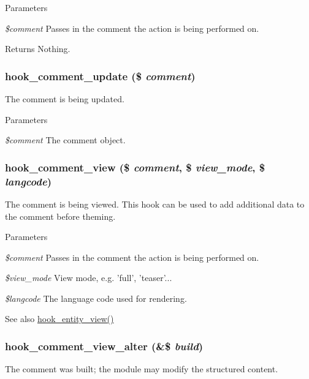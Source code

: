 \begin{DoxyParams}{Parameters}
\item[{\em \$comment}]Passes in the comment the action is being performed on. \end{DoxyParams}
\begin{DoxyReturn}{Returns}
Nothing. 
\end{DoxyReturn}
\hypertarget{group__hooks_ga63e0b41e7dbaadbf352b0a9c246d5ae5}{
\subsubsection[{hook\_\-comment\_\-update}]{\setlength{\rightskip}{0pt plus 5cm}hook\_\-comment\_\-update (\$ {\em comment})}}
\label{group__hooks_ga63e0b41e7dbaadbf352b0a9c246d5ae5}
The comment is being updated.


\begin{DoxyParams}{Parameters}
\item[{\em \$comment}]The comment object. \end{DoxyParams}
\hypertarget{group__hooks_gab162cbd3dc1b0395011df47ca3f98aa3}{
\subsubsection[{hook\_\-comment\_\-view}]{\setlength{\rightskip}{0pt plus 5cm}hook\_\-comment\_\-view (\$ {\em comment}, \/  \$ {\em view\_\-mode}, \/  \$ {\em langcode})}}
\label{group__hooks_gab162cbd3dc1b0395011df47ca3f98aa3}
The comment is being viewed. This hook can be used to add additional data to the comment before theming.


\begin{DoxyParams}{Parameters}
\item[{\em \$comment}]Passes in the comment the action is being performed on. \item[{\em \$view\_\-mode}]View mode, e.g. 'full', 'teaser'... \item[{\em \$langcode}]The language code used for rendering.\end{DoxyParams}
\begin{DoxySeeAlso}{See also}
\hyperlink{group__hooks_gae273ba271c2ef1192fe135afa9da5d49}{hook\_\-entity\_\-view()} 
\end{DoxySeeAlso}
\hypertarget{group__hooks_ga092d794b204b6db107a5f763ac1be659}{
\subsubsection[{hook\_\-comment\_\-view\_\-alter}]{\setlength{\rightskip}{0pt plus 5cm}hook\_\-comment\_\-view\_\-alter (\&\$ {\em build})}}
\label{group__hooks_ga092d794b204b6db107a5f763ac1be659}
The comment was built; the module may modify the structured content.

